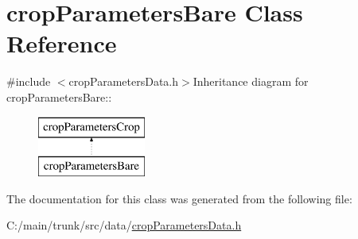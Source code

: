 \hypertarget{classcrop_parameters_bare}{
\section{cropParametersBare Class Reference}
\label{classcrop_parameters_bare}
}


{\ttfamily \#include $<$cropParametersData.h$>$}Inheritance diagram for cropParametersBare::\begin{figure}[H]
\begin{center}
\leavevmode
\includegraphics[height=2cm]{classcrop_parameters_bare}
\end{center}
\end{figure}


The documentation for this class was generated from the following file:\begin{DoxyCompactItemize}
\item 
C:/main/trunk/src/data/\hyperlink{crop_parameters_data_8h}{cropParametersData.h}\end{DoxyCompactItemize}
